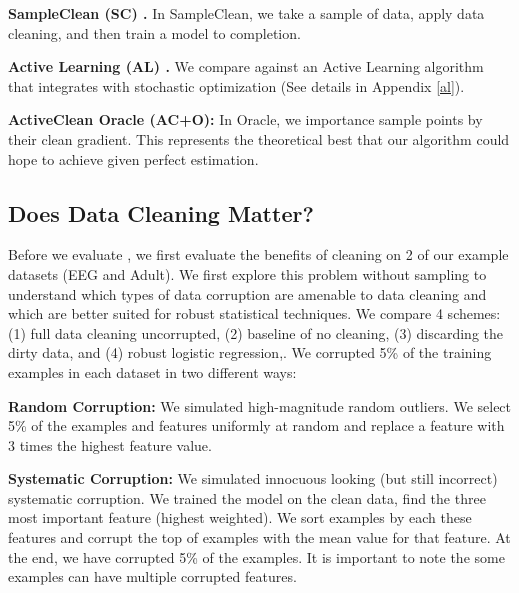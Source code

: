 \vspace{0.25em}

\noindent\textbf{SampleClean (SC) \cite{wang1999sample}. } In SampleClean, we take a sample of data, apply data cleaning, and then train a model to completion.

\vspace{0.25em}

\noindent\textbf{Active Learning (AL) \cite{guillory2009active}. } We compare against an Active Learning algorithm that integrates with stochastic optimization (See details in Appendix \ref{al}). 

\vspace{0.25em}

\noindent\textbf{ActiveClean Oracle (AC+O): } In \sys Oracle, we importance sample points by their clean gradient. This represents the theoretical best that our algorithm could hope to achieve given perfect estimation.

\subsection{Does Data Cleaning Matter?}
Before we evaluate \sys, we first evaluate the benefits of cleaning on 2 of our example datasets (EEG and Adult).
We first explore this problem without sampling to understand which types of data corruption are amenable to data cleaning and which are better suited for robust statistical techniques.
We compare 4 schemes: (1) full data cleaning uncorrupted, (2) baseline of no cleaning, (3) discarding the dirty data, and (4) robust logistic regression,. We corrupted 5\% of the training examples in each dataset in two different ways:

\vspace{0.5em}

\noindent\textbf{Random Corruption: } We simulated high-magnitude random outliers. We select 5\% of the examples and features uniformly at random and replace a feature with 3 times the highest feature value.

\vspace{0.5em}

\noindent\textbf{Systematic Corruption: } We simulated innocuous looking (but still incorrect) systematic corruption. We trained the model on the clean data, find the three most important feature (highest weighted). We sort examples by each these features and corrupt the top of examples with the mean value for that feature. 
At the end, we have corrupted 5\% of the examples.
It is important to note the some examples can have multiple corrupted features.

